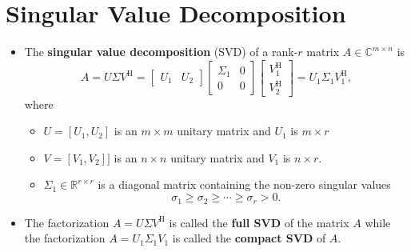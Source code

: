 \documentclass[11pt,twoside]{report}
\newcommand{\bbR}{{\mathbb{R}}}
\newcommand{\bbC}{{\mathbb{C}}}
\newcommand{\vecnot}{\underline}
\newcommand{\Herm}{{\mathrm{H}}}
\begin{document}
\section{Singular Value Decomposition} 

\begin{itemize}
\item The \textbf{singular value decomposition} (SVD) of a rank-$r$ matrix $A \in \bbC^{m \times n}$ is 
\begin{equation*}
A = U \Sigma V^\Herm
=\begin{bmatrix}  U_1 & U_2 \end{bmatrix} 
\begin{bmatrix} \Sigma_1 & 0 \\ 0 & 0 \end{bmatrix} 
\begin{bmatrix}  V_1^\Herm \\ V_2^\Herm  \end{bmatrix} = U_1 \Sigma_1 V_1^\Herm,
\end{equation*}
where
\begin{itemize}
\item $U  =[ U_1, U_2]$ %
is an $m \times m$ unitary matrix and $U_1$ is $m \times r$
\item $V = [ V_1, V_2]] $ is an $n \times n$ unitary matrix and $V_1$ is $n \times r$. 
%
\item  $\Sigma_1 \in \bbR^{r \times r}$  is a diagonal matrix containing the non-zero singular values 
\[ \sigma_1 \geq \sigma_2 \geq \cdots \geq \sigma_r > 0. \]
\end{itemize}


\item The factorization $A = U \Sigma V^\Herm$ is called the \textbf{full SVD} of the matrix $A$ while the factorization $A = U_1 \Sigma_1 V_1$ is called the \textbf{compact SVD} of $A$.



\end{itemize}
\end{document}
